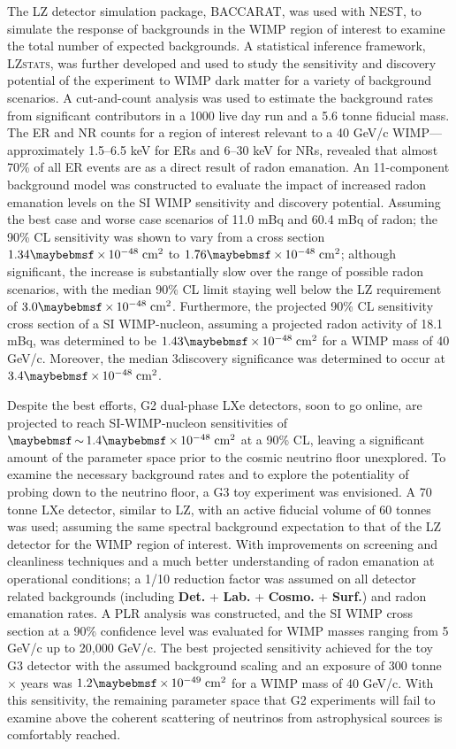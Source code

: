 The LZ detector simulation package, \textsc{BACCARAT}, was used with \textsc{NEST}, to simulate the response of backgrounds in the WIMP region of interest to examine the total number of expected backgrounds. A statistical inference framework, \textsc{LZstats}, was further developed and used to study the sensitivity and discovery potential of the experiment to WIMP dark matter for a variety of background scenarios. A cut-and-count analysis was used to estimate the background rates from significant contributors in a 1000 live day run and a 5.6 tonne fiducial mass. The ER and NR counts for a region of interest relevant to a 40 GeV/c\squared{} WIMP---approximately 1.5–6.5 keV for ERs and 6–30 keV for NRs, revealed that almost 70\% of all ER events are as a direct result of radon emanation. An 11-component background model was constructed to evaluate the impact of increased radon emanation levels on the SI WIMP sensitivity and discovery potential. Assuming the best case and worse case scenarios of 11.0 mBq and 60.4 mBq of radon; the 90\% CL sensitivity was shown to vary from a cross section $1.34\times10^{-48} \; \MathText{cm}^{2}$ to $1.76\times10^{-48} \; \MathText{cm}^{2}$; although significant, the increase is substantially slow over the range of possible radon scenarios, with the median 90\% CL limit staying well below the LZ requirement of $3.0\times10^{-48} \; \MathText{cm}^{2}$. Furthermore, the projected 90\% CL sensitivity cross section of a SI WIMP-nucleon, assuming a projected radon activity of 18.1 mBq, was determined to be $1.43\times10^{-48} \; \MathText{cm}^{2}$ for a WIMP mass of 40 GeV/c\squared{}. Moreover, the median 3\sigma  discovery significance was determined to occur at $3.4\times10^{-48} \; \MathText{cm}^{2}$. 

Despite the best efforts, G2 dual-phase LXe detectors, soon to go online, are projected to reach SI-WIMP-nucleon sensitivities of  $\sim1.4\times10^{-48} \; \MathText{cm}^{2}$ at a 90\% CL, leaving a significant amount of the parameter space prior to the cosmic neutrino floor unexplored. To examine the necessary background rates and to explore the potentiality of probing down to the neutrino floor, a G3 toy experiment was envisioned. A 70 tonne LXe detector, similar to LZ, with an active fiducial volume of 60 tonnes was used; assuming the same spectral background expectation to that of the LZ detector for the WIMP region of interest. With improvements on screening and cleanliness techniques and a much better understanding of radon emanation at operational conditions; a 1/10 reduction factor was assumed on all detector related backgrounds (including \textbf{Det.} + \textbf{Lab.} + \textbf{Cosmo.} + \textbf{Surf.}) and radon emanation rates. A PLR analysis was constructed, and the SI WIMP cross section at a 90\% confidence level was evaluated for WIMP masses ranging from 5 GeV/c\squared{} up to 20,000 GeV/c\squared{}. The best projected sensitivity achieved for the toy G3 detector with the assumed background scaling and an exposure of 300 tonne $\times$ years was $1.2\times10^{-49} \; \MathText{cm}^{2}$ for a WIMP mass of 40 GeV/c\squared{}. With this sensitivity, the remaining parameter space that G2 experiments will fail to examine above the coherent scattering of neutrinos from astrophysical sources is comfortably reached.

